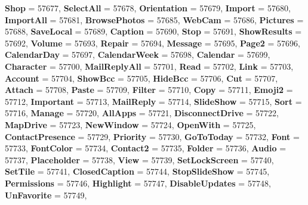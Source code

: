 \begin{DoxyCompactItemize}
{\bfseries Shop} = 57677, 
{\bfseries Select\+All} = 57678, 
{\bfseries Orientation} = 57679, 
{\bfseries Import} = 57680, 
\newline
{\bfseries Import\+All} = 57681, 
{\bfseries Browse\+Photos} = 57685, 
{\bfseries Web\+Cam} = 57686, 
{\bfseries Pictures} = 57688, 
\newline
{\bfseries Save\+Local} = 57689, 
{\bfseries Caption} = 57690, 
{\bfseries Stop} = 57691, 
{\bfseries Show\+Results} = 57692, 
\newline
{\bfseries Volume} = 57693, 
{\bfseries Repair} = 57694, 
{\bfseries Message} = 57695, 
{\bfseries Page2} = 57696, 
\newline
{\bfseries Calendar\+Day} = 57697, 
{\bfseries Calendar\+Week} = 57698, 
{\bfseries Calendar} = 57699, 
{\bfseries Character} = 57700, 
\newline
{\bfseries Mail\+Reply\+All} = 57701, 
{\bfseries Read} = 57702, 
{\bfseries Link} = 57703, 
{\bfseries Account} = 57704, 
\newline
{\bfseries Show\+Bcc} = 57705, 
{\bfseries Hide\+Bcc} = 57706, 
{\bfseries Cut} = 57707, 
{\bfseries Attach} = 57708, 
\newline
{\bfseries Paste} = 57709, 
{\bfseries Filter} = 57710, 
{\bfseries Copy} = 57711, 
{\bfseries Emoji2} = 57712, 
\newline
{\bfseries Important} = 57713, 
{\bfseries Mail\+Reply} = 57714, 
{\bfseries Slide\+Show} = 57715, 
{\bfseries Sort} = 57716, 
\newline
{\bfseries Manage} = 57720, 
{\bfseries All\+Apps} = 57721, 
{\bfseries Disconnect\+Drive} = 57722, 
{\bfseries Map\+Drive} = 57723, 
\newline
{\bfseries New\+Window} = 57724, 
{\bfseries Open\+With} = 57725, 
{\bfseries Contact\+Presence} = 57729, 
{\bfseries Priority} = 57730, 
\newline
{\bfseries Go\+To\+Today} = 57732, 
{\bfseries Font} = 57733, 
{\bfseries Font\+Color} = 57734, 
{\bfseries Contact2} = 57735, 
\newline
{\bfseries Folder} = 57736, 
{\bfseries Audio} = 57737, 
{\bfseries Placeholder} = 57738, 
{\bfseries View} = 57739, 
\newline
{\bfseries Set\+Lock\+Screen} = 57740, 
{\bfseries Set\+Tile} = 57741, 
{\bfseries Closed\+Caption} = 57744, 
{\bfseries Stop\+Slide\+Show} = 57745, 
\newline
{\bfseries Permissions} = 57746, 
{\bfseries Highlight} = 57747, 
{\bfseries Disable\+Updates} = 57748, 
{\bfseries Un\+Favorite} = 57749, 

\end{DoxyCompactItemize}
